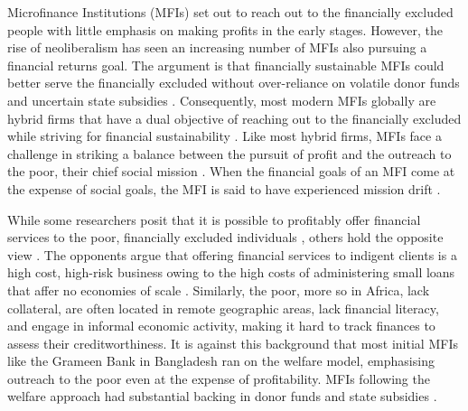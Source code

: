 \documentclass[a4paper, nobind]{templates/ociamthesis}
\begin{document}
Microfinance Institutions (MFIs) set out to reach out to the financially excluded people with little emphasis on making profits in the early stages. However, the rise of neoliberalism has seen an increasing number of MFIs also pursuing a financial returns goal. The argument is that financially sustainable MFIs could better serve the financially excluded without over-reliance on volatile donor funds and uncertain state subsidies \autocite{garmaise2013cheap,d2017aid,armendariz2013subsidy,d2013unsubsidized}. Consequently, most modern MFIs globally are hybrid firms that have a dual objective of reaching out to the financially excluded while striving for financial sustainability \autocite{d2017ngos}. Like most hybrid firms, MFIs face a challenge in striking a balance between the pursuit of profit and the outreach to the poor, their chief social mission \autocite{jia2016commercialization,d2013unsubsidized}. When the financial goals of an MFI come at the expense of social goals, the MFI is said to have experienced mission drift \autocite{mersland2010microfinance}.

While some researchers posit that it is possible to profitably offer financial services to the poor, financially excluded individuals \autocite{kodongo2013individual}, others hold the opposite view \autocite{mersland2010microfinance}. The opponents argue that offering financial services to indigent clients is a high cost, high-risk business owing to the high costs of administering small loans that affer no economies of scale \autocite{ledgerwood2006transforming}. Similarly, the poor, more so in Africa, lack collateral, are often located in remote geographic areas, lack financial literacy, and engage in informal economic activity, making it hard to track finances to assess their creditworthiness. It is against this background that most initial MFIs like the Grameen Bank in Bangladesh ran on the welfare model, emphasising outreach to the poor even at the expense of profitability. MFIs following the welfare approach had substantial backing in donor funds and state subsidies \autocite{armendariz2013subsidy}.
\end{document}
